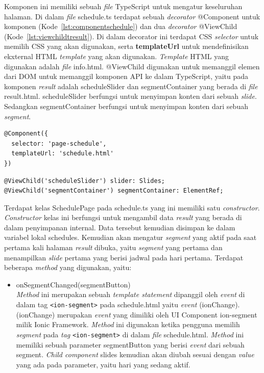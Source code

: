 \begin{enumerate}
\begin{enumerate}
		Komponen ini memiliki sebuah \textit{file} TypeScript untuk mengatur keseluruhan halaman. Di dalam \textit{file} schedule.ts terdapat sebuah \textit{decorator} @Component untuk komponen (Kode~\ref{lst:componentschedule}) dan dua \textit{decorator} @ViewChild (Kode~\ref{lst:viewchildtresult}). Di dalam decorator ini terdapat CSS \textit{selector} untuk memilih CSS yang akan digunakan, serta \textbf{templateUrl} untuk mendefinisikan ekxternal HTML \textit{template} yang akan digunakan. \textit{Template} HTML yang digunakan adalah \textit{file} info.html. @ViewChild digunakan untuk memanggil elemen dari DOM untuk memanggil komponen API ke dalam TypeScript, yaitu pada komponen \textit{result} adalah scheduleSlider dan segmentContainer yang berada di \textit{file} result.html. scheduleSlider berfungsi untuk menyimpan konten dari sebuah \textit{slide}. Sedangkan segmentContainer berfungsi untuk menyimpan konten dari sebuah \textit{segment}.
	\newpage
\begin{lstlisting}[label={lst:componentschedule}, caption=@Component pada schedule.ts]
@Component({
  selector: 'page-schedule',
  templateUrl: 'schedule.html'
})
\end{lstlisting}

\begin{lstlisting}[label={lst:viewchildtresult}, caption=@ViewChild pada schedule.ts]
@ViewChild('scheduleSlider') slider: Slides;
@ViewChild('segmentContainer') segmentContainer: ElementRef;
\end{lstlisting} 

	Terdapat kelas SchedulePage pada schedule.ts yang ini memiliki satu \textit{constructor}. \textit{Constructor} kelas ini berfungsi untuk mengambil data \textit{result} yang berada di dalam penyimpanan internal. Data tersebut kemudian disimpan ke dalam variabel lokal schedules. Kemudian akan mengatur \textit{segment} yang aktif pada saat pertama kali halaman \textit{result} dibuka, yaitu \textit{segment} yang pertama dan menampilkan \textit{slide} pertama yang berisi jadwal pada hari pertama. Terdapat beberapa \textit{method} yang digunakan, yaitu:
	
	\begin{itemize}
		\item onSegmentChanged(segmentButton) \\
		\textit{Method} ini merupakan sebuah \textit{template statement} dipanggil oleh \textit{event} di dalam tag \texttt{<ion-segment>} pada schedule.html yaitu \textit{event} (ionChange). (ionChange) merupakan \textit{event} yang dimiliki oleh UI Component ion-segment milik Ionic Framework. \textit{Method} ini digunakan ketika pengguna memilih \textit{segment} pada \textit{tag} \texttt{<ion-segment>} di dalam \textit{file} schedule.html. \textit{Method} ini memiliki sebuah parameter segmentButton yang berisi \textit{event} dari sebuah segment. \textit{Child component} slides kemudian akan diubah sesuai dengan \textit{value} yang ada pada parameter, yaitu hari yang sedang aktif. 


\end{itemize}
\end{enumerate}
\end{enumerate}
